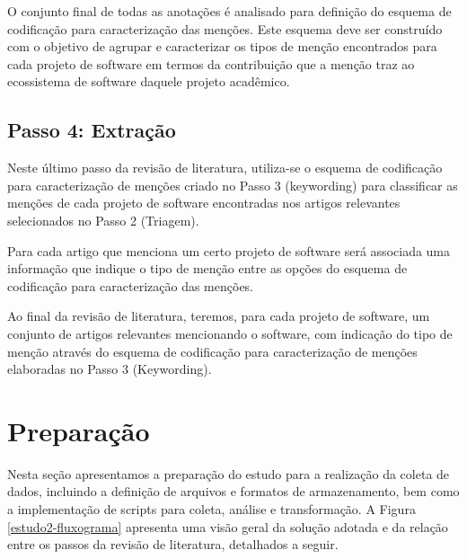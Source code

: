 O conjunto final de todas as anotações é analisado
para definição do esquema de codificação para caracterização das menções. 
Este esquema deve ser construído com o objetivo de agrupar e caracterizar os tipos
de menção encontrados para cada projeto de software em termos da contribuição
que a menção traz ao ecossistema de software daquele projeto acadêmico.


\subsection{Passo 4: Extração}

Neste último passo da revisão de literatura, utiliza-se o esquema de codificação
para caracterização de menções criado no Passo 3 (keywording) para classificar as
menções de cada projeto de software encontradas nos artigos relevantes
selecionados no Passo 2 (Triagem).

Para cada artigo que menciona um certo projeto de software será associada uma
informação que indique o tipo de menção entre as opções do esquema de codificação
para caracterização das menções.

Ao final da revisão de literatura, teremos, para cada projeto de software, um
conjunto de artigos relevantes mencionando o software, com indicação do tipo de menção
através do esquema de codificação para caracterização de menções elaboradas no Passo 3 (Keywording).


\section{Preparação} \label{estudo2:preparacao} %

Nesta seção apresentamos a preparação do estudo para a realização da coleta de
dados, incluindo a definição de arquivos e formatos de armazenamento, bem como
a implementação de scripts para coleta, análise e transformação.
A Figura \ref{estudo2-fluxograma} apresenta uma visão geral da solução adotada
e da relação entre os passos da revisão de literatura, detalhados a seguir.

